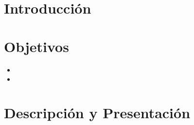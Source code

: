 \section{Introducci\'on}

\section{Objetivos}
\begin{itemize}
 \item 
 \item
\end{itemize}

\section{Descripci\'on y Presentaci\'on}
